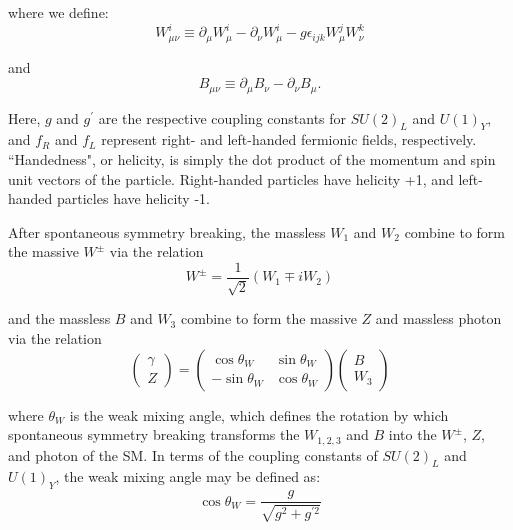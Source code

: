 \noindent where we define:
\begin{equation}
W^{i}_{\mu\nu} \equiv \partial_{\mu}W^{i}_{\mu} - \partial_{\nu}W^{i}_{\mu} - g\epsilon_{ijk}W^{j}_{\mu}W^{k}_{\nu}
\end{equation}

\noindent and
\begin{equation}
B_{\mu\nu} \equiv \partial_{\mu}B_{\nu} - \partial_{\nu}B_{\mu}.
\end{equation}

Here, $g$ and $g^{\prime}$ are the respective coupling constants for $SU(2)_{L}$ and $U(1)_{Y}$, and $f_{R}$ and $f_{L}$ represent right- and left-handed fermionic fields, respectively. ``Handedness", or helicity, is simply the dot product of the momentum and spin unit vectors of the particle. Right-handed particles have helicity +1, and left-handed particles have helicity -1.

After spontaneous symmetry breaking, the massless $W_{1}$ and $W_{2}$ combine to form the massive $W^{\pm}$ via the relation
\begin{equation}
W^{\pm} = \frac{1}{\sqrt{2}}\left(W_{1} \mp iW_{2}\right)
\end{equation}

\noindent and the massless $B$ and $W_{3}$ combine to form the massive $Z$ and massless photon via the relation
\begin{equation}
\begin{pmatrix}\gamma \\Z\end{pmatrix}=\begin{pmatrix}\cos \theta _{W}&\sin \theta _{W}\\-\sin \theta _{W}&\cos \theta _{W}\end{pmatrix}\begin{pmatrix}B\\W_{3}\end{pmatrix}
\end{equation}

\noindent where $\theta_{W}$ is the weak mixing angle, which defines the rotation by which spontaneous symmetry breaking transforms the $W_{1,2,3}$ and $B$ into the $W^{\pm}$, $Z$, and photon of the SM. In terms of the coupling constants of $SU(2)_{L}$ and $U(1)_{Y}$, the weak mixing angle may be defined as\cite{srednicki}:
\begin{equation}
\cos \theta_{W} = \frac{g}{\sqrt{g^{2} + g^{\prime2}}}
\end{equation}

